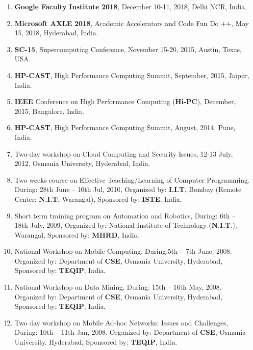 \begin{enumerate}

\item
\textbf{Google Faculty Institute 2018}, December 10-11, 2018, Delhi NCR, India.

\item
\textbf{Microsoft AXLE 2018}, Academic Accelerators and Code Fun Do ++, May 15, 2018, Hyderabad, India.

\item
\textbf{SC-15}, Supercomputing Conference, November 15-20, 2015, Austin, Texas, USA.

\item
\textbf{HP-CAST}, High Performance Computing Summit, September, 2015, Jaipur, India.

\item
\textbf{IEEE} Conference on High Performance Computing (\textbf{Hi-PC}), December, 2015, Bangalore, India.

\item
\textbf{HP-CAST}, High Performance Computing Summit, August, 2014, Pune, India.

\item
Two-day workshop on Cloud Computing and Security Issues, 12-13 July, 2012, Osmania University, Hyderabad, India.

\item
Two weeks course on Effective Teaching/Learning of Computer Programming. During: 28th June – 10th Jul, 2010, Organized by:\textbf{ I.I.T}, Bombay (Remote Center:\textbf{ N.I.T}, Warangal), Sponsored by: \textbf{ISTE}, India.

\item
Short term training program on Automation and Robotics, During: 6th – 18th July, 2009, Organized by: National Institute of Technology (\textbf{N.I.T}.), Warangal, Sponsored by: \textbf{MHRD}, India. 

\item
National Workshop on Mobile Computing, During:5th – 7th June, 2008. Organized by: Department of \textbf{CSE}, Osmania University, Hyderabad, Sponsored by: \textbf{TEQIP}, India. 

\item
National Workshop on Data Mining, During: 15th – 16th May, 2008. Organized by: Department of \textbf{CSE}, Osmania University, Hyderabad, Sponsored by: \textbf{TEQIP}, India. 

\item
Two day workshop on Mobile Ad-hoc Networks: Issues and Challenges, During: 10th – 11th Jan, 2008. Organized by: Department of \textbf{CSE}, Osmania University, Hyderabad, Sponsored by: \textbf{TEQIP}, India. 


\end{enumerate}

